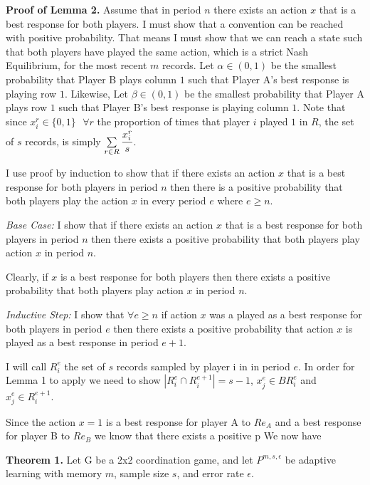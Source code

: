 \documentclass{article}
\begin{document}
\textbf{Proof of Lemma 2.} Assume that in period $n$ there exists an action $x$ that is a best response for both players. I must show that a convention can be reached with positive probability. That means I must show that we can reach a state such that both players have played the same action, which is a strict Nash Equilibrium, for the most recent $m$ records.
Let $\alpha \in (0,1)$ be the smallest probability that Player B plays column $1$ such that Player A's best response is playing row $1$. Likewise, Let $\beta \in (0,1)$ be the smallest probability that Player A plays row $1$ such that Player B's best response is playing column $1$.
Note that since $x_i^r \in \{0,1\} \hspace{8pt} \forall r$ the proportion of times that player $i$ played $1$ in $R$, the set of $s$ records, is simply $\sum\limits_{r \in R} \cfrac{x_i^r}{s}$.

I use proof by induction to show that if there exists an action $x$ that is a best response for both players in period $n$ then there is a positive probability that both players play the action $x$ in every period $e$ where $e \geq n$.

\vskip12pt

\textit{Base Case:} I show that if there exists an action $x$ that is a best response for both players in period $n$ then there exists a positive probability that both players play action $x$ in period $n$.

Clearly, if $x$ is a best response for both players then there exists a positive probability that both players play action $x$ in period $n$.

\vskip12pt

\textit{Inductive Step:} I show that $\forall e \geq n$ if action $x$ was a played as a best response for both players in period $e$ then there exists a positive probability that action $x$ is played as a best response in period $e+1$.

I will call $R_i^e$ the set of $s$ records sampled by player i in in period $e$.
In order for Lemma 1 to apply we need to show $|R_i^e \cap R_i^{e+1}|=s-1$, $x_j^{e} \in BR_i^e$ and $x_j^{e} \in R_i^{e+1}$.  


Since the action $x=1$ is a best response for player A to $Re_A$ and a best response for player B to $Re_B$ we know that there exists a positive p
We now have 


\vskip24pt

\textbf{Theorem 1.} Let G be a 2x2 coordination game, and let $P^{m,s,\epsilon}$ be adaptive learning with memory $m$, sample size $s$, and error rate $\epsilon$.
\end{document}
